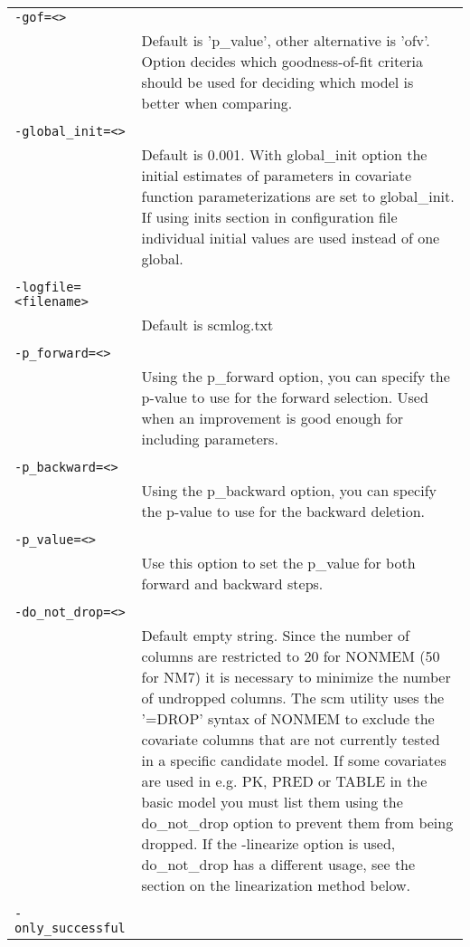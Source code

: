 \documentclass[a4paper,12pt]{article}
\begin{document}
\begin{longtable}{p{1in}p{4in}}
\verb|-gof=<>| & \\
\nopagebreak
 & Default is 'p\_value', other alternative is 'ofv'. Option decides which goodness-of-fit criteria should be used for deciding which model is better when comparing. \\
\\
\verb|-global_init=<>| & \\
\nopagebreak
 & Default is 0.001. With global\_init option the initial estimates of parameters in covariate function parameterizations are set to global\_init. If using inits section in configuration file individual initial values are used instead of one global. \\
\\
\verb|-logfile=<filename>| & \\
\nopagebreak
 & Default is scmlog.txt \\
\\
\verb|-p_forward=<>| & \\
\nopagebreak
 & Using the p\_forward option, you can specify the p-value to use for the forward selection. Used when an improvement is good enough for including parameters. \\
\\
\verb|-p_backward=<>| & \\
\nopagebreak
 & Using the p\_backward option, you can specify the p-value to use for the backward deletion. \\
\\
\verb|-p_value=<>| & \\
\nopagebreak
 & Use this option to set the p\_value for both forward and backward steps. \\
\\
\verb|-do_not_drop=<>| & \\
\nopagebreak
 & Default empty string. Since the number of columns are restricted to 20 for NONMEM (50 for NM7) it is necessary to minimize the number of undropped columns. The scm utility uses the '=DROP' syntax of NONMEM to exclude the covariate columns that are not currently tested in a specific candidate model. If some covariates are used in e.g. PK, PRED or TABLE in the basic model you must list them using the do\_not\_drop option to prevent them from being dropped. If the -linearize option is used, do\_not\_drop has a different usage, see the section on the linearization method below. \\
\\
\verb|-only_successful| & \\

\end{longtable}
\end{document}
